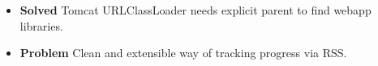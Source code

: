 \begin{itemize}
    \item \textbf{Solved} Tomcat URLClassLoader needs explicit parent to find webapp libraries.
    \item \textbf{Problem} Clean and extensible way of tracking progress via RSS.
\end{itemize}